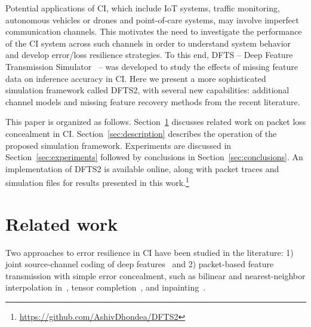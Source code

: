 \documentclass[conference,letterpaper]{IEEEtran}
\begin{document}
Potential applications of CI, which include IoT systems, traffic monitoring, autonomous vehicles or drones and point-of-care systems, may involve imperfect communication channels. This motivates the need to investigate the performance of the CI system across such channels in order to understand system behavior and develop error/loss resilience strategies. To this end, DFTS -- Deep Feature Transmission Simulator~\cite{unnibhavi2018dfts} -- was developed to study the effects of missing feature data on inference accuracy in CI. Here we present a more sophisticated simulation framework called DFTS2, with several new capabilities: additional channel models and missing feature recovery methods from the recent literature.

This paper is organized as follows. Section~\ref{sec:related_work} discusses related work on packet loss concealment in CI. Section~\ref{sec:description} describes the operation of the proposed simulation framework. Experiments are discussed in Section~\ref{sec:experiments} followed by conclusions in Section~\ref{sec:conclusions}. An implementation of DFTS2 is available online, along with packet traces and simulation files for results presented in this work.\footnote{\url{https://github.com/AshivDhondea/DFTS2}}

\section{Related work} \label{sec:related_work}
Two approaches to error resilience in CI have been studied in the literature: 1) joint source-channel coding of deep features~\cite{choi_neural_2019,BottleNet++} and 2) packet-based feature transmission with simple error concealment, such as bilinear  and nearest-neighbor interpolation in~\cite{unnibhavi2018dfts}, tensor completion~\cite{Bragile2020,CALTeC_ICIP_2021}, and inpainting~\cite{Bajic2021objdet}.
\end{document}
